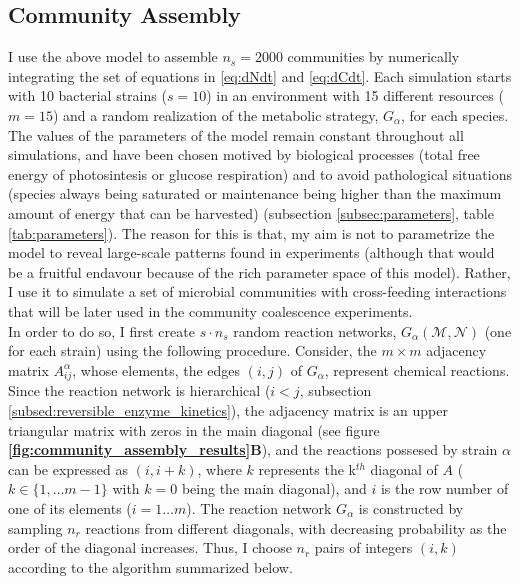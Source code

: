 \documentclass[titlepage,11pt]{article}
\begin{document}
\begin{linenumbers}
\begin{singlespace}
				\subsection{Community Assembly}
				 I use the above model to assemble $ n_{s} = 2000 $ communities by numerically integrating the set of equations in \ref{eq:dNdt} and \ref{eq:dCdt}. Each simulation starts with 10 bacterial strains ($ s = 10 $) in an environment with 15 different resources ($ m = 15 $) and a random realization of the metabolic strategy, $ G_{\alpha} $, for each species.\\	
				The values of the parameters of the model remain constant throughout all simulations, and have been chosen motived by biological processes (total free energy of photosintesis or glucose respiration) and to avoid pathological situations (species always being saturated or maintenance being higher than the maximum amount of energy that can be harvested) (subsection \ref{subsec:parameters}, table \ref{tab:parameters}). The reason for this is that, my aim is not to parametrize the model to reveal large-scale patterns found in experiments (although that would be a fruitful endavour because of the rich parameter space of this model). Rather, I use it to simulate a set of microbial communities with cross-feeding interactions that will be later used in the community coalescence experiments.\\
				In order to do so, I first create $ s \cdot n_{s}  $ random reaction networks, $ G_{\alpha}(\mathcal{M}, \mathcal{N}) $ (one for each strain) using the following  procedure. Consider, the $ m \times m $ adjacency matrix $ A^{\alpha}_{ij} $, whose elements, the edges $ (i, j) $ of $ G_{\alpha}$, represent chemical reactions. Since the reaction network is hierarchical ($ i < j $, subsection \ref{subsed:reversible_enzyme_kinetics}), the adjacency matrix is an upper triangular matrix with zeros in the main diagonal (see figure \textbf{\ref{fig:community_assembly_results}B}), and the reactions possesed by strain $ \alpha $ can be expressed as $ (i, i + k) $, where $ k $ represents the k$ ^{th} $ diagonal of $ A $ ($ k \in \{1, \dots m - 1 \}$ with $ k = 0 $ being the main diagonal), and $ i $ is the row number of one of its elements ($ i = 1 \dots m $). The reaction network $ G_{\alpha} $ is constructed by sampling $ n_{r} $ reactions from  different diagonals, with decreasing probability as the order of the diagonal increases. Thus, I choose $ n_{r} $ pairs of integers $ (i , k )$ according to the algorithm summarized below.	
				\begin{enumerate}

\end{enumerate}
\end{singlespace}
\end{linenumbers}
\end{document}
